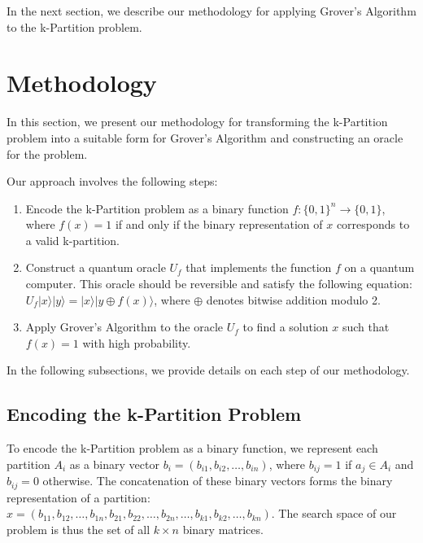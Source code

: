 In the next section, we describe our methodology for applying Grover's Algorithm to the k-Partition problem.

\section{Methodology}\label{sec:methodology}

In this section, we present our methodology for transforming the k-Partition problem into a suitable form for Grover's Algorithm and constructing an oracle for the problem.

Our approach involves the following steps:

\begin{enumerate}
    \item Encode the k-Partition problem as a binary function $f: \{0, 1\}^n \rightarrow \{0, 1\}$, where $f(x) = 1$ if and only if the binary representation of $x$ corresponds to a valid k-partition.

    \item Construct a quantum oracle $U_f$ that implements the function $f$ on a quantum computer. This oracle should be reversible and satisfy the following equation: $U_f|x\rangle|y\rangle = |x\rangle|y \oplus f(x)\rangle$, where $\oplus$ denotes bitwise addition modulo 2.

    \item Apply Grover's Algorithm to the oracle $U_f$ to find a solution $x$ such that $f(x) = 1$ with high probability.

\end{enumerate}

In the following subsections, we provide details on each step of our methodology.

\subsection{Encoding the k-Partition Problem}

To encode the k-Partition problem as a binary function, we represent each partition $A_i$ as a binary vector $b_i = (b_{i1}, b_{i2}, \ldots, b_{in})$, where $b_{ij} = 1$ if $a_j \in A_i$ and $b_{ij} = 0$ otherwise. The concatenation of these binary vectors forms the binary representation of a partition: $x = (b_{11}, b_{12}, \ldots, b_{1n}, b_{21}, b_{22}, \ldots, b_{2n}, \ldots, b_{k1}, b_{k2}, \ldots, b_{kn})$. The search space of our problem is thus the set of all $k \times n$ binary matrices.


